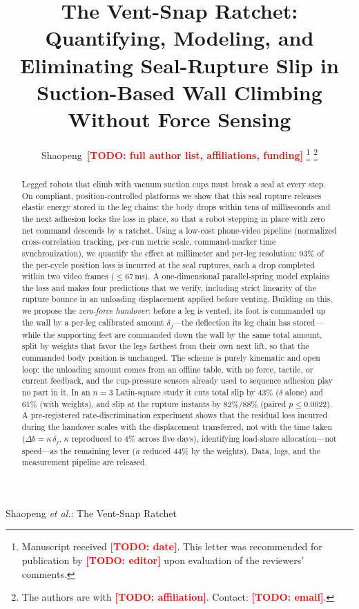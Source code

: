 \documentclass[journal]{IEEEtran}
\newcommand{\TODO}[1]{\textcolor{red}{\textbf{[TODO: #1]}}}
\begin{document}
\title{The Vent-Snap Ratchet: Quantifying, Modeling, and Eliminating
Seal-Rupture Slip in Suction-Based Wall Climbing Without Force Sensing}

\author{Shaopeng~\TODO{full author list, affiliations, funding}%
\thanks{Manuscript received \TODO{date}. This letter was recommended for
publication by \TODO{editor} upon evaluation of the reviewers' comments.}%
\thanks{The authors are with \TODO{affiliation}. Contact: \TODO{email}.}}

%
{Shaopeng \MakeLowercase{\textit{et al.}}: The Vent-Snap Ratchet}

\maketitle

\begin{abstract}
Legged robots that climb with vacuum suction cups must break a seal at
every step. On compliant, position-controlled platforms we show that this
seal rupture releases elastic energy stored in the leg chains: the body
drops within tens of milliseconds and the next adhesion locks the loss in
place, so that a robot stepping in place with zero net command descends by
a ratchet. Using a low-cost phone-video pipeline (normalized cross-correlation
tracking, per-run metric scale, command-marker time synchronization), we
quantify the effect at millimeter and per-leg resolution: $93\%$ of the
per-cycle position loss is incurred at the seal ruptures, each a drop
completed within two video frames ($\le67$\,ms). A
one-dimensional parallel-spring model explains the loss and makes four
predictions that we verify, including strict linearity of the rupture
bounce in an unloading displacement applied before venting. Building on
this, we propose the \emph{zero-force handover}: before a leg is vented,
its foot is commanded up the wall by a per-leg calibrated amount
$\delta_j$---the deflection its leg chain has stored---while the
supporting feet are commanded down the wall by the same total amount,
split by weights that favor the legs farthest from their own next lift,
so that the commanded body position is unchanged. The scheme is purely
kinematic and open loop: the unloading amount comes from an offline
table, with no force, tactile, or current feedback, and the cup-pressure
sensors already used to sequence adhesion play no part in it. In an
$n{=}3$ Latin-square study it cuts total slip by $43\%$
($\delta$ alone) and $61\%$ (with weights), and slip at the rupture
instants by $82\%$/$88\%$ (paired $p\le0.0022$). A pre-registered
rate-discrimination experiment shows that the residual loss incurred
during the handover scales with the displacement transferred, not with
the time taken ($\Delta b=\kappa\,\delta_j$, $\kappa$ reproduced to
$4\%$ across five days), identifying load-share allocation---not
speed---as the remaining lever ($\kappa$ reduced $44\%$ by the weights).
Data, logs, and the measurement pipeline are released.
\end{abstract}
\end{document}
